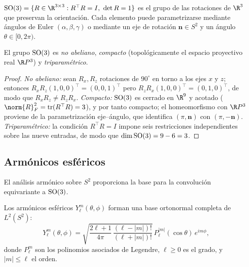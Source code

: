\begin{definition}[El grupo $\SO(3)$]
\label{def:groups:so3}
$\SO(3) = \{R \in \R^{3 \times 3} : R^\top R = I,\ \det R = 1\}$ es el grupo de
las rotaciones de $\R^3$ que preservan la orientaci\'on. Cada elemento puede
parametrizarse mediante \'angulos de Euler $(\alpha, \beta, \gamma)$ o mediante un
eje de rotaci\'on $\mathbf{n} \in S^2$ y un \'angulo $\theta \in [0, 2\pi)$.
\end{definition}

\begin{proposition}[Propiedades de $\SO(3)$]
\label{prop:groups:so3-properties}
El grupo $\SO(3)$ es \emph{no abeliano}, \emph{compacto} (topol\'ogicamente el
espacio proyectivo real $\R P^3$) y \emph{triparam\'etrico}.
\end{proposition}

\begin{proof}
\emph{No abeliano:} sean $R_x, R_z$ rotaciones de $90^\circ$ en torno a los ejes
$x$ y $z$; entonces $R_x R_z (1,0,0)^\top = (0,0,1)^\top$ pero $R_z R_x
(1,0,0)^\top = (0,1,0)^\top$, de modo que $R_x R_z \neq R_z R_x$.
\emph{Compacto:} $\SO(3)$ es cerrado en $\R^9$ y acotado ($\norm{R}_F^2 =
\operatorname{tr}(R^\top R) = 3$), y por tanto compacto; el homeomorfismo con
$\R P^3$ proviene de la parametrizaci\'on eje--\'angulo, que identifica $(\pi,
\mathbf{n})$ con $(\pi, -\mathbf{n})$. \emph{Triparam\'etrico:} la condici\'on
$R^\top R = I$ impone seis restricciones independientes sobre las nueve entradas,
de modo que $\dim \operatorname{SO}(3) = 9 - 6 = 3$.
\end{proof}

\subsection{Arm\'onicos esf\'ericos}
\label{sec:groups:spherical-harmonics}

El an\'alisis arm\'onico sobre $S^2$ proporciona la base para la convoluci\'on
equivariante a $\SO(3)$.

\begin{definition}
\label{def:groups:spherical-harmonics}
Los arm\'onicos esf\'ericos $Y_\ell^m(\theta, \phi)$ forman una base ortonormal
completa de $L^2(S^2)$:
\begin{equation}
  Y_\ell^m(\theta, \phi) = \sqrt{\frac{2\ell+1}{4\pi}\,
    \frac{(\ell - |m|)!}{(\ell + |m|)!}}\,
    P_\ell^{|m|}(\cos\theta)\, e^{im\phi},
\end{equation}
donde $P_\ell^m$ son los polinomios asociados de Legendre, $\ell \geq 0$ es el
grado, y $|m| \leq \ell$ el orden.
\end{definition}

